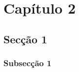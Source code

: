 \chapter{Cap\'itulo 2}
\label{ch:cap2}

\section{Sec\c{c}\~ao 1}
\subsection{Subsec\c{c}\~ao 1}

\lipsum[5] \cite{bolzan/00}

\lipsum[6] \cite{xin/01}

\lipsum[7] \cite{bohr/98}

\lipsum[8] \cite{culf/96}

\lipsum[9] \cite{NBR6023:2002b}

\lipsum[10] \cite{mauri:2003}

\lipsum[11] \cite{lba/06}